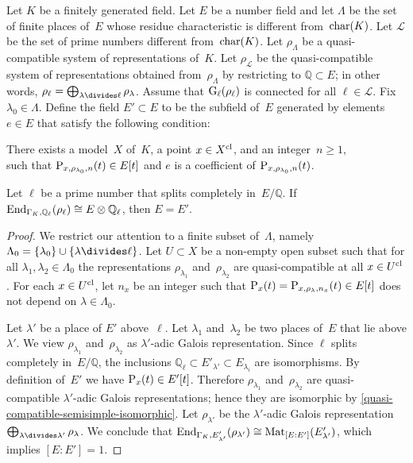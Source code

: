 \documentclass[10pt,twoside,leqno]{article}
\numberwithin{equation}{subsection}
\newcommand{\End}{\textnormal{End}}
\newcommand{\Mat}{\textnormal{Mat}}
\newcommand{\QQ}{\mathbb{Q}}
\newcommand{\QQl}{\QQ_{\ell}}
\newcommand{\primes}{\mathscr{L}}
\newcommand{\cl}{\textnormal{cl}}
\newcommand{\GG}{\textnormal{G}}
\newcommand{\Gl}{\GG_{\ell}}
\newcommand{\chrc}{\textnormal{char}}
\begin{document}
\begin{proposition} %
 \label{recover-endomorphisms}
 Let $K$ be a finitely generated field.
 Let $E$ be a number field
 and let $\Lambda$ be the set of finite places of~$E$
 whose residue characteristic is different from~$\chrc(K)$.
 \def\primes{\mathscr{L}}%
 Let $\primes$ be the set of prime numbers different from~$\chrc(K)$.
 Let $\rho_\Lambda$ be a quasi-compatible system of representations of~$K$.
 Let $\rho_\primes$ be the quasi-compatible system of representations
obtained from~$\rho_\Lambda$ by restricting to $\QQ \subset E$;
 in other words, $\rho_\ell = \bigoplus_{\lambda \divides \ell} \rho_\lambda$.
 Assume that $\Gl(\rho_\ell)$ is connected for all $\ell \in \primes$.
 Fix $\lambda_0 \in \Lambda$.
 Define the field $E' \subset E$ to be the
 subfield of~$E$ generated by elements $e \in E$
 that satisfy the following condition:

 {\narrower\noindent
  There exists a model~$X$ of~$K$,
  a point $x \in X^\cl$,
  and an integer~$n \ge 1$,\\
  such that $\mathrm{P}_{x,\rho_{\lambda_0},n}(t) \in E[t]$
  and $e$ is a coefficient of $\mathrm{P}_{x,\rho_{\lambda_0},n}(t)$.
  \par}

 \noindent
 Let $\ell$ be a prime number that splits completely in~$E/\QQ$.
 If $\End_{\Gamma_K,\QQl}(\rho_\ell) \cong E \otimes \QQl$,
 then $E = E'$.
 \begin{proof}
  We restrict our attention to a finite subset of~$\Lambda$,
  namely $\Lambda_0 = \{\lambda_0\} \cup \{ \lambda \divides \ell \}$.
  Let $U \subset X$ be a non-empty open subset such that
  for all $\lambda_1, \lambda_2 \in \Lambda_0$
  the representations
  $\rho_{\lambda_1}$ and~$\rho_{\lambda_2}$
  are quasi-compatible at all $x \in U^\cl$.
  For each $x \in U^\cl$,
  let $n_x$ be an integer such that
  $\mathrm{P}_x(t) = \mathrm{P}_{x,\rho_\lambda,n_x}(t) \in E[t]$
  does not depend on $\lambda \in \Lambda_0$.

  Let $\lambda'$ be a place of $E'$ above~$\ell$.
  Let $\lambda_1$ and~$\lambda_2$ be two places
  of~$E$ that lie above $\lambda'$.
  We view $\rho_{\lambda_1}$ and~$\rho_{\lambda_2}$
  as $\lambda'$-adic Galois representation.
  Since $\ell$ splits completely in~$E/\QQ$,
  the inclusions $\QQl \subset E'_{\lambda'} \subset E_{\lambda_i}$
  are isomorphisms.
  By definition of~$E'$ we have $\mathrm{P}_x(t) \in E'[t]$.
  Therefore $\rho_{\lambda_1}$ and~$\rho_{\lambda_2}$
  are quasi-compatible $\lambda'$-adic Galois representations;
  hence they are isomorphic by \cref{quasi-compatible-semisimple-isomorphic}.
  Let $\rho_{\lambda'}$ be the $\lambda'$-adic Galois representation
  $\bigoplus_{\lambda \divides \lambda'} \rho_\lambda$.
  We conclude that
  $\End_{\Gamma_K,E'_{\lambda'}}(\rho_{\lambda'})
   \cong \Mat_{[E:E']}(E'_{\lambda'})$,
  which implies $[E:E'] = 1$.
 \end{proof}
\end{proposition}
\end{document}

